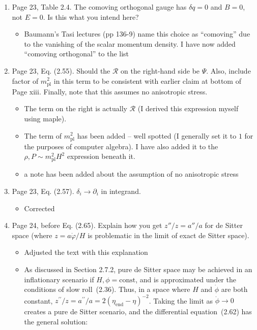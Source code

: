 \documentclass[11pt]{article}
\begin{document}
\begin{enumerate}
\item Page 23, Table 2.4. The comoving orthogonal gauge has $\delta q
  = 0$ and $B=0$, not $E=0$. Is this what you intend here?
  \begin{itemize}
    \item Baumann's Tasi lectures (pp 136-9) name this choice as ``comoving'' due to the vanishing of the scalar momentum density. I have now added ``comoving orthogonal'' to the list
  \end{itemize}
\item Page 23, Eq. (2.55). Should the $\mathcal{R}$ on the right-hand
  side be $\Psi$. Also, include factor of $m_{\text{pl}}^2$ in this
  term to be consistent with earlier claim at bottom of Page
  xiii. Finally, note that this assumes no anisotropic stress.
  \begin{itemize}
    \item The term on the right is actually $\mathcal{R}$ (I derived this expression myself using maple). 
    \item The term of $m_{\text{pl}}^2$ has been added -- well spotted (I generally set it to $1$ for the purposes of computer algebra). I have also added it to the $\rho,P\sim m_\text{pl}^2 H^2$ expression beneath it.
    \item a note has been added about the assumption of no anisotropic stress
  \end{itemize}
\item Page 23, Eq. (2.57). $\delta_i \rightarrow \partial_i$ in
  integrand.
  \begin{itemize}
    \item Corrected
  \end{itemize}
\item Page 24, before Eq. (2.65). Explain how you get $z''/z = a''/a$
  for de Sitter space (where $z = a\dot{\varphi}/H$ is problematic in
  the limit of exact de Sitter space).
  \begin{itemize}
    \item Adjusted the text with this explanation
    \item As discussed in Section 2.7.2, pure de Sitter space may be achieved in an inflationary scenario if \(H,\phi=\mathrm{const}\), and is approximated under the conditions of slow roll~(2.36).  Thus, in a space where \(H\) and \(\dot\phi\) are both constant, \({z^{\prime\prime}/z = a^{\prime\prime}/a = 2{(\eta_\mathrm{end}-\eta)}^{-2}}\). Taking the limit as \(\dot{\phi}\to0\) creates a pure de Sitter scenario, and the differential equation~(2.62) has the general solution:

\end{itemize}
\end{enumerate}
\end{document}

